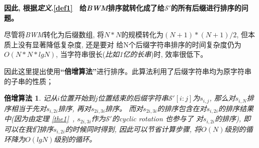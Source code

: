 \documentclass[UTF8]{ctexart}
\newcommand{\refd}[1]{\emph{定义}.\ref{#1}\ }
\newcommand{\reft}[1]{\emph{定理} \ref{#1}\ }
\newtheorem*{bz}{倍增算法}
\begin{document}
    \textbf{因此, 根据\refd{def1} 给\emph{BWM}排序就转化成了给$\mathcal{S}'$的所有后缀进行排序的问题。}
    \par 尽管将\emph{BWM}转化为后缀数组, 将$N*N$的规模转化为$(N+1)*(N+1)/2$, 但本质上没有显著降低复杂度, 还是要对
    给N个后缀字符串排序的时间复杂度仍为$O(N*N*lgN)$, 
    当字符串很长(\emph{比如1亿的长串})时, 效率很低下。

    因此这里提出使用\textbf{“倍增算法”}进行排序。此算法利用了后缀字符串均为原字符串的子串的性质；
    
    \begin{bz}  记从$i$位置开始到$j$位置结束的后缀字符串$\mathcal{S'}[i:j]$为$s_{i,j}$, 那么对$s_{i,N}$排序相当于先对$s_{i,2i}$排序, 再对$s_{2i,3i}$排序。
    而对$s_{2i,3i}$的排序包含在对$s_{i,2i}$的排序结果中(因为由\reft{the1}, $s_{2i,3i}$作为$\mathcal{S'}$的\emph{cyclic rotation} 也参与了
    对$s_{i,2i}$的排序), 即可以在我们排序$s_{i,2i}$的时候同时得到, 因此可以节省计算步骤, 将$O(N)$级别的循环降为$O(lgN)$级别的循环。
    \end{bz}
\end{document}
